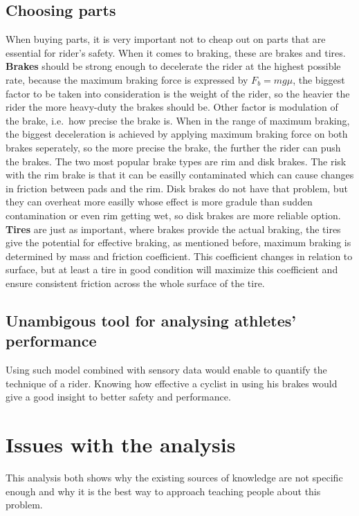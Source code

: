 \documentclass[12pt, a4]{article}
\begin{document}
\subsection{Choosing parts}
When buying parts, it is very important not to cheap out on parts that are essential for rider's safety. When it comes to braking, these
are brakes and tires. \textbf{Brakes} should be strong enough to decelerate the rider at the highest possible rate, because the
maximum braking force is expressed by $F_b = mg\mu$, the biggest factor to be taken into consideration is the weight of the rider, so
the heavier the rider the more heavy-duty the brakes should be. Other factor is modulation of the brake, i.e.~how precise the brake
is. When in the range of maximum braking, the biggest deceleration is achieved by applying maximum braking force on both brakes 
seperately, so the more precise the brake, the further the rider can push the brakes. The two most popular brake types are rim and
disk brakes. The risk with the rim brake is that it can be easilly contaminated which can cause changes in friction between pads and
the rim. Disk brakes do not have that problem, but they can overheat more easilly whose effect is more gradule than sudden contamination
or even rim getting wet, so disk brakes are more reliable option. \textbf{Tires} are just as important, where brakes provide the actual
braking, the tires give the potential for effective braking, as mentioned before, maximum braking is determined by mass and friction
coefficient. This coefficient changes in relation to surface, but at least a tire in good condition will maximize this coefficient
and ensure consistent friction across the whole surface of the tire. 
\subsection{Unambigous tool for analysing athletes' performance}
Using such model combined with sensory data would enable to quantify the technique of a rider. Knowing how effective a cyclist
in using his brakes would give a good insight to better safety and performance.

\section{Issues with the analysis}
This analysis both shows why the existing sources of knowledge are not specific enough and why it is the best way to approach teaching
people about this problem.
\end{document}
